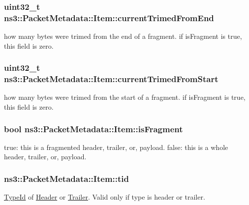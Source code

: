 \subsubsection[{\texorpdfstring{current\+Trimed\+From\+End}{currentTrimedFromEnd}}]{\setlength{\rightskip}{0pt plus 5cm}uint32\+\_\+t ns3\+::\+Packet\+Metadata\+::\+Item\+::current\+Trimed\+From\+End}\hypertarget{structns3_1_1PacketMetadata_1_1Item_a330aa45f4eec52e6d2615c275e878096}{}\label{structns3_1_1PacketMetadata_1_1Item_a330aa45f4eec52e6d2615c275e878096}
how many bytes were trimed from the end of a fragment. if is\+Fragment is true, this field is zero. 
\subsubsection[{\texorpdfstring{current\+Trimed\+From\+Start}{currentTrimedFromStart}}]{\setlength{\rightskip}{0pt plus 5cm}uint32\+\_\+t ns3\+::\+Packet\+Metadata\+::\+Item\+::current\+Trimed\+From\+Start}\hypertarget{structns3_1_1PacketMetadata_1_1Item_a869b374807faf214a990ff591be8c693}{}\label{structns3_1_1PacketMetadata_1_1Item_a869b374807faf214a990ff591be8c693}
how many bytes were trimed from the start of a fragment. if is\+Fragment is true, this field is zero. 
\subsubsection[{\texorpdfstring{is\+Fragment}{isFragment}}]{\setlength{\rightskip}{0pt plus 5cm}bool ns3\+::\+Packet\+Metadata\+::\+Item\+::is\+Fragment}\hypertarget{structns3_1_1PacketMetadata_1_1Item_a26a638c974e533c90a41687217df2574}{}\label{structns3_1_1PacketMetadata_1_1Item_a26a638c974e533c90a41687217df2574}
true\+: this is a fragmented header, trailer, or, payload. false\+: this is a whole header, trailer, or, payload. 
\subsubsection[{\texorpdfstring{tid}{tid}}]{ ns3\+::\+Packet\+Metadata\+::\+Item\+::tid}\hypertarget{structns3_1_1PacketMetadata_1_1Item_a07dac03d1aa1be885295bdfd113f78e7}{}\label{structns3_1_1PacketMetadata_1_1Item_a07dac03d1aa1be885295bdfd113f78e7}
\hyperlink{classns3_1_1TypeId}{Type\+Id} of \hyperlink{classns3_1_1Header}{Header} or \hyperlink{classns3_1_1Trailer}{Trailer}. Valid only if type is header or trailer. 
